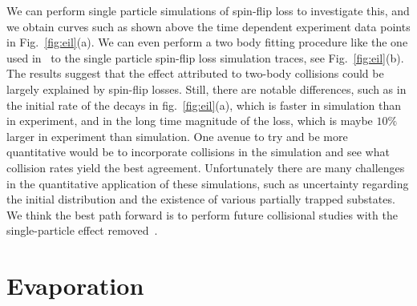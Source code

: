 \documentclass[%
 reprint,
 amsmath,amssymb,
 aps,
pra,
]{revtex4-1}
\begin{document}
We can perform single particle simulations of spin-flip loss to investigate this, and we obtain curves such as shown above the time dependent experiment data points in Fig.~\ref{fig:eil}(a).
We can even perform a two body fitting procedure like the one used in~\cite{Stuhl2013} to the single particle spin-flip loss simulation traces, see Fig.~\ref{fig:eil}(b). 
The results suggest that the effect attributed to two-body collisions could be largely explained by spin-flip losses.
Still, there are notable differences, such as in the initial rate of the decays in fig.~\ref{fig:eil}(a), which is faster in simulation than in experiment, and in the long time magnitude of the loss, which is maybe $10\%$ larger in experiment than simulation.
One avenue to try and be more quantitative would be to incorporate collisions in the simulation and see what collision rates yield the best agreement.
Unfortunately there are many challenges in the quantitative application of these simulations, such as uncertainty regarding the initial distribution and the existence of various partially trapped substates.
We think the best path forward is to perform future collisional studies with the single-particle effect removed~\cite{smt}.

\section{Evaporation\label{sec:evap}}
\end{document}
